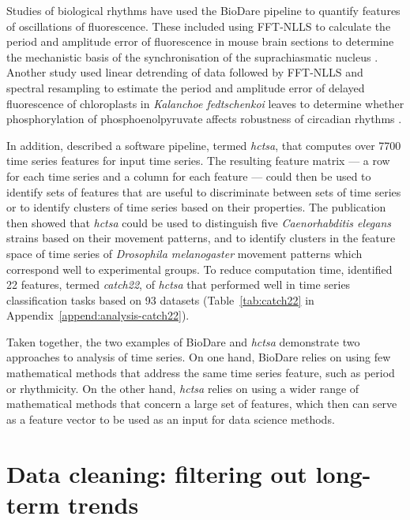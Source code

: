 Studies of biological rhythms have used the BioDare pipeline to quantify features of oscillations of fluorescence.
These included using FFT-NLLS to calculate the period and amplitude error of fluorescence in mouse brain sections to determine the mechanistic basis of the synchronisation of the suprachiasmatic nucleus \parencite{hamnettVasoactiveIntestinalPeptide2019}.
Another study used linear detrending of data followed by FFT-NLLS and spectral resampling to estimate the period and amplitude error of delayed fluorescence of chloroplasts in \textit{Kalanchoe fedtschenkoi} leaves to determine whether phosphorylation of phosphoenolpyruvate affects robustness of circadian rhythms \parencite{boxallPhosphorylationPhosphoenolpyruvateCarboxylase2017}.

In addition, \textcite{fulcherHctsaComputationalFramework2017} described a software pipeline, termed \textit{hctsa}, that computes over 7700 time series features for input time series.
The resulting feature matrix --- a row for each time series and a column for each feature --- could then be used to identify sets of features that are useful to discriminate between sets of time series or to identify clusters of time series based on their properties.
The publication then showed that \textit{hctsa} could be used to distinguish five \textit{Caenorhabditis elegans} strains based on their movement patterns, and to identify clusters in the feature space of time series of \textit{Drosophila melanogaster} movement patterns which correspond well to experimental groups.
To reduce computation time, \textcite{lubbaCatch22CAnonicalTimeseries2019} identified 22 features, termed \textit{catch22}, of \textit{hctsa} that performed well in time series classification tasks based on 93 datasets (Table~\ref{tab:catch22} in Appendix~\ref{append:analysis-catch22}).

Taken together, the two examples of BioDare and \textit{hctsa} demonstrate two approaches to analysis of time series.
On one hand, BioDare relies on using few mathematical methods that address the same time series feature, such as period or rhythmicity.
On the other hand, \textit{hctsa} relies on using a wider range of mathematical methods that concern a large set of features, which then can serve as a feature vector to be used as an input for data science methods.


\section{Data cleaning: filtering out long-term trends}
\label{sec:analysis-cleaning}

